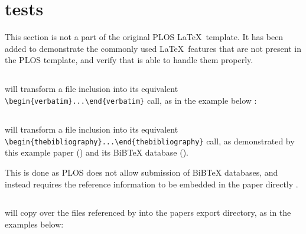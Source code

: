 \section*{ tests}

This section is not a part of the original PLOS \LaTeX~template.
It has been added to demonstrate the commonly used \LaTeX~features that are not present in the PLOS template, and verify that  is able to handle them properly.

\subsection*{}

 will transform a \verb|| file inclusion into its equivalent \verb|\begin{verbatim}...\end{verbatim}| call, as in the example below \cite{Project:friendly_name_mixin:CodeRepository}:



\subsection*{}

 will transform a \verb|| file inclusion into its equivalent \verb|\begin{thebibliography}...\end{thebibliography}| call, as demonstrated by this example paper () and its BiBTeX database ().

This is done as PLOS does not allow submission of BiBTeX databases, and instead requires the reference information to be embedded in the paper directly \cite{PLOS:LaTeX}.

\subsection*{}

 will copy over the files referenced by \verb|| into the papers export directory, as in the examples below:



